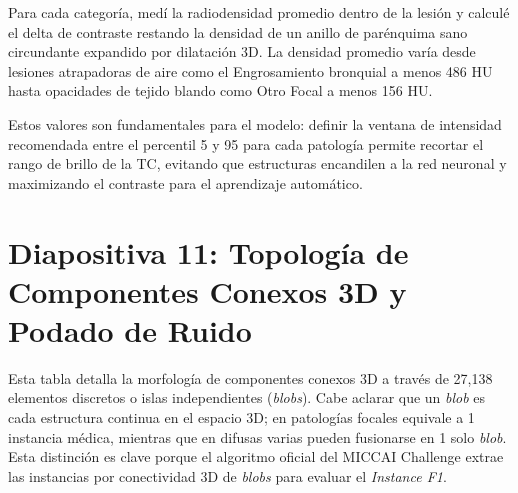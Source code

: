 \documentclass[11pt, a4paper]{article}
\begin{document}
Para cada categoría, medí la radiodensidad promedio dentro de la lesión y calculé el delta de contraste restando la densidad de un anillo de parénquima sano circundante expandido por dilatación 3D. La densidad promedio varía desde lesiones atrapadoras de aire como el Engrosamiento bronquial a menos 486 HU hasta opacidades de tejido blando como Otro Focal a menos 156 HU.

Estos valores son fundamentales para el modelo: definir la ventana de intensidad recomendada entre el percentil 5 y 95 para cada patología permite recortar el rango de brillo de la TC, evitando que estructuras encandilen a la red neuronal y maximizando el contraste para el aprendizaje automático.

\bigskip

\section{Diapositiva 11: Topología de Componentes Conexos 3D y Podado de Ruido}

Esta tabla detalla la morfología de componentes conexos 3D a través de 27,138 elementos discretos o islas independientes (\textit{blobs}). Cabe aclarar que un \textit{blob} es cada estructura continua en el espacio 3D; en patologías focales equivale a 1 instancia médica, mientras que en difusas varias pueden fusionarse en 1 solo \textit{blob}. Esta distinción es clave porque el algoritmo oficial del MICCAI Challenge extrae las instancias por conectividad 3D de \textit{blobs} para evaluar el \textit{Instance F1}.
\end{document}
